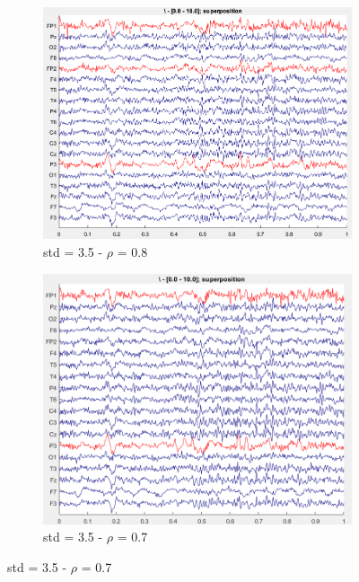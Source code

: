 \documentclass[hidelinks,12pt]{article}
\begin{document}
	\begin{figure}[!h]
		\centering
		\begin{subfigure}{0.45\textwidth}
			\centering
			\includegraphics[height=0.8\linewidth]{30}
			\caption{std = 3.5 - $\rho$ = 0.8}
		\end{subfigure}
		\hspace{1cm}
		\begin{subfigure}{0.45\textwidth}
			\centering
			\includegraphics[height=0.8\linewidth]{31}
			\caption{std = 3.5 - $\rho$ = 0.7}
		\end{subfigure}
	\end{figure}
	
\end{document}
